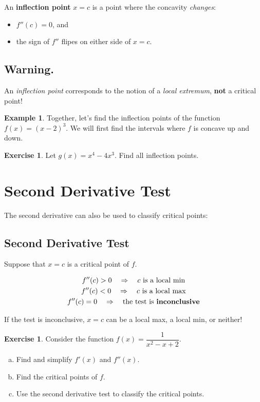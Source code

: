 \documentclass[11pt,reqno,final]{amsart}
\numberwithin{figure}{section}
\theoremstyle{definition} %
\newtheorem{example}[equation]{Example}%
\newtheorem{exercise}[question]{Exercise}
\begin{document}
An \textbf{inflection point} $x = c$ is a point where the concavity \textit{changes}:
\begin{itemize}
\item $f''(c) = 0$, and
\item the sign of $f''$ flipes on either side of $x = c$.
\end{itemize}
\subsection*{Warning.} An \textit{inflection point} corresponds to the notion of a \textit{local extremum}, \textbf{not} a critical point!

\begin{example}
        Together, let's find the inflection points of the function $f(x) = (x-2)^3$.
        We will first find the intervals where $f$ is concave up and down.
        \vfill
\end{example}

\newpage

\begin{exercise}
        Let $g(x) = x^4 - 4x^3$. Find all inflection points.
        \vfill
        \vfill
\end{exercise}

\section{Second Derivative Test}

The second derivative can also be used to classify critical points:
\subsection*{Second Derivative Test}
Suppose that $x = c$ is a critical point of $f$.
\begin{framed}
        \begin{gather*}
                f''(c) > 0 \quad  \Rightarrow \quad \mbox{$c$ is a local min}\\
                f''(c) < 0 \quad \Rightarrow \quad \mbox{$c$ is a local max}\\
                f''(c) = 0 \quad \Rightarrow \quad \mbox{the test is \textbf{inconclusive}}
        \end{gather*}
\end{framed}
If the test is inconclusive, $x = c$ can be a local max, a local min, or neither!

\begin{exercise}
        Consider the function $f(x) = \dfrac{1}{x^2-x+2}$.
        \begin{enumerate}[(a)]
        \item Find and simplify $f'(x)$ and $f''(x)$.
                \vfill
        \item Find the critical points of $f$.
                \vfill
        \item Use the second derivative test to classify the critical points.
                \vfill
        \end{enumerate}
\end{exercise}
\end{document}
